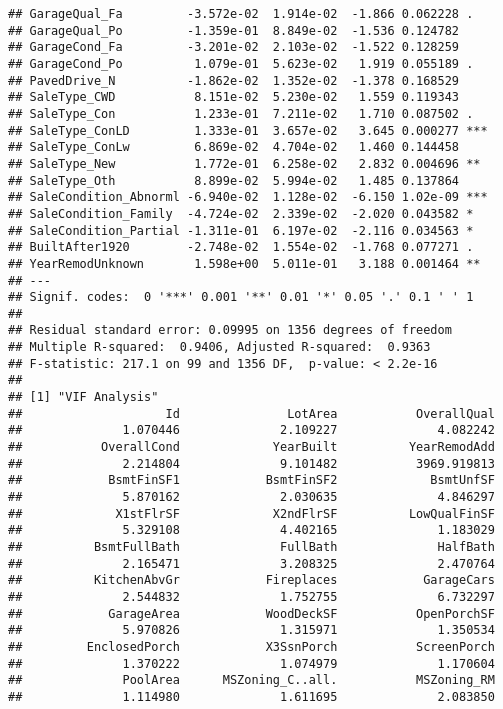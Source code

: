 \documentclass[
]{article}
\begin{document}
\begin{verbatim}
## GarageQual_Fa         -3.572e-02  1.914e-02  -1.866 0.062228 .  
## GarageQual_Po         -1.359e-01  8.849e-02  -1.536 0.124782    
## GarageCond_Fa         -3.201e-02  2.103e-02  -1.522 0.128259    
## GarageCond_Po          1.079e-01  5.623e-02   1.919 0.055189 .  
## PavedDrive_N          -1.862e-02  1.352e-02  -1.378 0.168529    
## SaleType_CWD           8.151e-02  5.230e-02   1.559 0.119343    
## SaleType_Con           1.233e-01  7.211e-02   1.710 0.087502 .  
## SaleType_ConLD         1.333e-01  3.657e-02   3.645 0.000277 ***
## SaleType_ConLw         6.869e-02  4.704e-02   1.460 0.144458    
## SaleType_New           1.772e-01  6.258e-02   2.832 0.004696 ** 
## SaleType_Oth           8.899e-02  5.994e-02   1.485 0.137864    
## SaleCondition_Abnorml -6.940e-02  1.128e-02  -6.150 1.02e-09 ***
## SaleCondition_Family  -4.724e-02  2.339e-02  -2.020 0.043582 *  
## SaleCondition_Partial -1.311e-01  6.197e-02  -2.116 0.034563 *  
## BuiltAfter1920        -2.748e-02  1.554e-02  -1.768 0.077271 .  
## YearRemodUnknown       1.598e+00  5.011e-01   3.188 0.001464 ** 
## ---
## Signif. codes:  0 '***' 0.001 '**' 0.01 '*' 0.05 '.' 0.1 ' ' 1
## 
## Residual standard error: 0.09995 on 1356 degrees of freedom
## Multiple R-squared:  0.9406, Adjusted R-squared:  0.9363 
## F-statistic: 217.1 on 99 and 1356 DF,  p-value: < 2.2e-16
## 
## [1] "VIF Analysis"
##                    Id               LotArea           OverallQual 
##              1.070446              2.109227              4.082242 
##           OverallCond             YearBuilt          YearRemodAdd 
##              2.214804              9.101482           3969.919813 
##            BsmtFinSF1            BsmtFinSF2             BsmtUnfSF 
##              5.870162              2.030635              4.846297 
##             X1stFlrSF             X2ndFlrSF          LowQualFinSF 
##              5.329108              4.402165              1.183029 
##          BsmtFullBath              FullBath              HalfBath 
##              2.165471              3.208325              2.470764 
##          KitchenAbvGr            Fireplaces            GarageCars 
##              2.544832              1.752755              6.732297 
##            GarageArea            WoodDeckSF           OpenPorchSF 
##              5.970826              1.315971              1.350534 
##         EnclosedPorch            X3SsnPorch           ScreenPorch 
##              1.370222              1.074979              1.170604 
##              PoolArea      MSZoning_C..all.           MSZoning_RM 
##              1.114980              1.611695              2.083850 

\end{verbatim}
\end{document}
